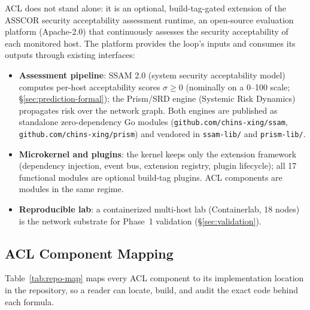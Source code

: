 \documentclass[11pt]{article}
\begin{document}
ACL does not stand alone: it is an optional, build-tag-gated extension of the
ASSCOR security acceptability assessment runtime, an open-source evaluation
platform (Apache-2.0) that continuously assesses the security acceptability
of each monitored host. The platform provides the loop's inputs and
consumes its outputs through existing interfaces:
\begin{itemize}
\item \textbf{Assessment pipeline}: SSAM 2.0 (system security acceptability
      model) computes per-host acceptability scores $\sigma \ge 0$
      (nominally on a 0--100 scale; \S\ref{sec:prediction-formal});
      the Prism/SRD engine (Systemic Risk Dynamics) propagates risk over the
      network graph. Both engines are published as standalone zero-dependency
      Go modules (\texttt{github.com/chins-xing/ssam},
      \texttt{github.com/chins-xing/prism}) and vendored in
      \texttt{ssam-lib/} and \texttt{prism-lib/}.
\item \textbf{Microkernel and plugins}: the kernel keeps only the extension
      framework (dependency injection, event bus, extension registry, plugin
      lifecycle); all 17 functional modules are optional build-tag plugins.
      ACL components are modules in the same regime.
\item \textbf{Reproducible lab}: a containerized multi-host lab
      (Containerlab, 18 nodes) is the network substrate for Phase~1
      validation (\S\ref{sec:validation}).
\end{itemize}

\subsection{ACL Component Mapping}

Table~\ref{tab:repo-map} maps every ACL component to its implementation
location in the repository, so a reader can locate, build, and audit the
exact code behind each formula.
\end{document}
